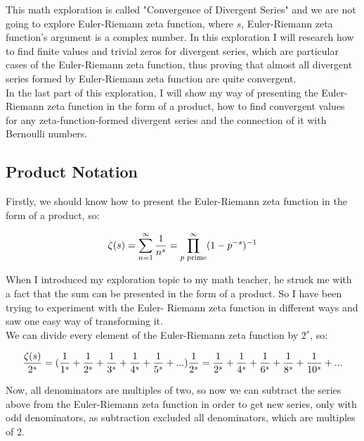 \documentclass{beamer}
\begin{document}
This math exploration is called "Convergence of Divergent Series" and we are not going to explore
Euler-Riemann zeta function, where $s$, Euler-Riemann zeta function's argument is a complex
number. In this exploration I will research how to find finite values and trivial zeros for divergent
series, which are particular cases of the Euler-Riemann zeta function, thus proving that almost all
divergent series formed by Euler-Riemann zeta function are quite convergent.\\

In the last part of this exploration, I will show my way of presenting the Euler-Riemann zeta
function in the form of a product, how to find convergent values for any zeta-function-formed
divergent series and the connection of it with Bernoulli numbers.

\subsection{Product Notation}

Firstly, we should know how to present the Euler-Riemann zeta function in the form of a product,
so:

\begin{equation}
  \zeta(s)=\sum_{n=1}^{\infty} \frac{1}{n^s}=\prod_{p \text{ prime}}^{\infty} (1-p^{-s})^{-1}\\
\end{equation}

When I introduced my exploration topic to my math teacher, he struck me with a fact that the sum
can be presented in the form of a product. So I have been trying to experiment with the Euler-
Riemann zeta function in different ways and saw one easy way of transforming it.\\

We can divide every element of the Euler-Riemann zeta function by $2^s$, so:

\begin{equation*}
  \frac{\zeta(s)}{2^s}= (\frac{1}{1^s}+\frac{1}{2^s}+\frac{1}{3^s}+
  \frac{1}{4^s}+\frac{1}{5^s}+...)\frac{1}{2^s}=
  \frac{1}{2^s}+\frac{1}{4^s}+\frac{1}{6^s}+
  \frac{1}{8^s}+\frac{1}{10^s}+...\\
  \end{equation*}

Now, all denominators are multiples of two, so now we can subtract the series above from the
Euler-Riemann zeta function in order to get new series, only with odd denominators, as subtraction
excluded all denominators, which are multiples of 2.
\end{document}
